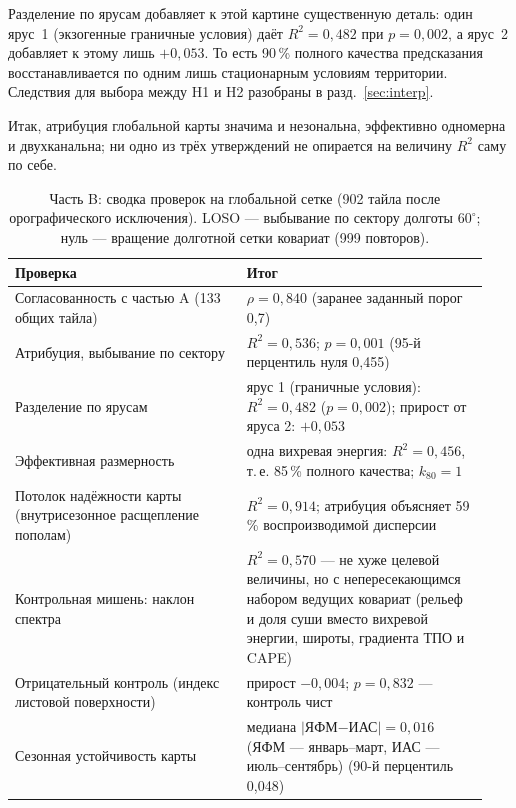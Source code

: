 \documentclass[11pt,a4paper]{article}
\begin{document}
Разделение по ярусам добавляет к этой картине существенную деталь: один ярус~1 (экзогенные граничные условия) даёт $R^2=0{,}482$ при $p=0{,}002$, а ярус~2 добавляет к этому лишь $+0{,}053$. То есть 90\,\% полного качества предсказания восстанавливается по одним лишь стационарным условиям территории. Следствия для выбора между H1 и H2 разобраны в разд.~\ref{sec:interp}.

Итак, атрибуция глобальной карты значима и незональна, эффективно одномерна и двухканальна; ни одно из трёх утверждений не опирается на величину $R^2$ саму по себе.

\begin{table}[t]
\centering
\caption{Часть B: сводка проверок на глобальной сетке (902 тайла после орографического исключения). LOSO --- выбывание по сектору долготы $60^\circ$; нуль --- вращение долготной сетки ковариат (999 повторов).}
\label{tab:armB}
\small
\begin{tabular}{@{}p{0.46\linewidth}p{0.48\linewidth}@{}}
\toprule
Проверка & Итог\\
\midrule
Согласованность с частью A (133 общих тайла) & $\rho=0{,}840$ (заранее заданный порог 0,7)\\
Атрибуция, выбывание по сектору & $R^2=0{,}536$; $p=0{,}001$ (95-й перцентиль нуля 0,455)\\
Разделение по ярусам & ярус 1 (граничные условия): $R^2=0{,}482$ ($p=0{,}002$); прирост от яруса 2: $+0{,}053$\\
Эффективная размерность & одна вихревая энергия: $R^2=0{,}456$, т.\,е. 85\,\% полного качества; $k_{80}=1$\\
Потолок надёжности карты (внутрисезонное расщепление пополам) & $R^2=0{,}914$; атрибуция объясняет 59\,\% воспроизводимой дисперсии\\
Контрольная мишень: наклон спектра & $R^2=0{,}570$ --- не хуже целевой величины, но с непересекающимся набором ведущих ковариат (рельеф и доля суши вместо вихревой энергии, широты, градиента ТПО и CAPE)\\
Отрицательный контроль (индекс листовой поверхности) & прирост $-0{,}004$; $p=0{,}832$ --- контроль чист\\
Сезонная устойчивость карты & медиана $\lvert$ЯФМ$-$ИАС$\rvert=0{,}016$ (ЯФМ --- январь--март, ИАС --- июль--сентябрь) (90-й перцентиль 0,048)\\
\bottomrule
\end{tabular}
\end{table}
\end{document}
